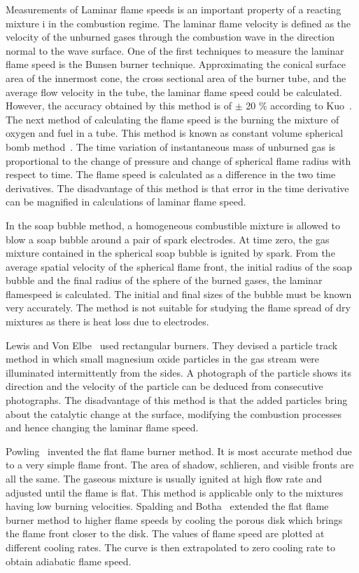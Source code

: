 Measurements of Laminar flame speeds is an important property of a
reacting mixture i in the combustion regime. The laminar flame velocity is defined as the
velocity of the unburned gases through the combustion wave in the
direction normal to the wave surface. One of the first techniques to measure the laminar flame
speed is the Bunsen burner technique. Approximating the conical
surface area of the innermost cone, the cross sectional area of the
burner tube, and the average flow velocity in the tube, the laminar flame
speed could be calculated. However, the accuracy obtained by this
method is of $\pm $ 20 \% according to Kuo~\cite{Kuo}. The next method
of calculating the flame speed is the burning the mixture of oxygen
and fuel in a tube. This method is known as constant volume spherical
bomb method~\cite{Kuo}. The time variation of instantaneous mass of
unburned gas is proportional to the change of pressure and change of
spherical flame radius with respect to time. The flame speed is
calculated as a difference in the two time derivatives. The
disadvantage of this method is that error in the time derivative can be
magnified in calculations of laminar flame speed.

 In the soap bubble method, a homogeneous combustible mixture is
allowed to blow a soap bubble around a pair of spark electrodes. At
time zero, the gas mixture contained in the spherical soap bubble is
ignited by spark. From the average spatial velocity of the spherical
flame front, the initial radius of the soap bubble and the final
radius of the sphere of the burned gases, the laminar flamespeed is
calculated. The initial and final sizes of the bubble must be known
very accurately. The method is not suitable for studying the flame
spread of dry mixtures as there is heat loss due to electrodes.

 Lewis and Von Elbe~\cite{lewis} used rectangular
burners. They devised a particle track method in which small magnesium
oxide particles in the gas stream were illuminated intermittently from the
sides. A photograph of the particle shows its direction and the
velocity of the particle can be deduced from consecutive
photographs. The disadvantage of this method is that the added
particles bring about the catalytic change at the surface, modifying the combustion
processes and hence changing the laminar flame speed.

 Powling~\cite{powling} invented the flat flame burner
method. It is most accurate method due to a very simple flame
front. The area of shadow, schlieren, and visible fronts are all the
same. The gaseous mixture is usually ignited at high flow rate and
adjusted until the flame is flat. This method is applicable only to
the mixtures having low burning velocities. Spalding and
Botha~\cite{spalding} extended the flat flame burner method to higher flame
speeds by cooling the porous disk which brings the flame front closer to
the disk. The values of flame speed are plotted at different cooling
rates. The curve is then extrapolated to zero cooling rate to obtain
adiabatic flame speed.

